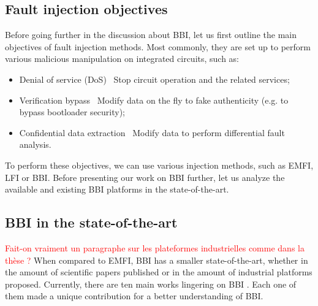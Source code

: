


	\subsection{Fault injection objectives}
		Before going further in the discussion about BBI, let us first outline the main objectives of fault injection methods.
		Most commonly, they are set up to perform various malicious manipulation on integrated circuits, such as:
		\begin{itemize}
			\item Denial of service (DoS) \textrightarrow\ Stop circuit operation and the related services;
			\item Verification bypass \textrightarrow\ Modify data on the fly to fake authenticity (e.g. to bypass bootloader security);
			\item Confidential data extraction \textrightarrow\ Modify data to perform differential fault analysis.
		\end{itemize}
		To perform these objectives, we can use various injection methods, such as EMFI, LFI or BBI.
		Before presenting our work on BBI further, let us analyze the available and existing BBI platforms in the state-of-the-art.

	\subsection{BBI in the state-of-the-art}
	\textcolor{red}{Fait-on vraiment un paragraphe sur les plateformes industrielles comme dans la thèse ?}
		When compared to EMFI, BBI has a smaller state-of-the-art, whether in the amount of scientific papers published or in the amount of industrial platforms proposed.
		Currently, there are ten main works lingering on BBI \cite{bbiOrigin, bbiSecond, bbiThird, bbiColin,japbbi, japbbi2, mybbiCosade, mybbiFdtc2022, mybbifdtc2023, colinFdtc2023}.
		Each one of them made a unique contribution for a better understanding of BBI.

